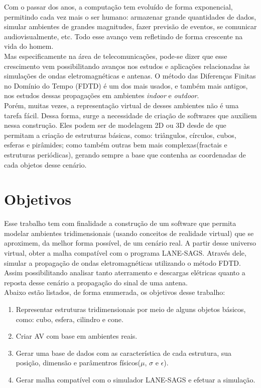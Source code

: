 Com o passar dos anos, a computação tem evoluído de forma exponencial\cite{comp_history}, permitindo cada vez mais o ser humano: armazenar grande quantidades de dados, simular ambientes de grandes magnitudes, fazer previsão de eventos, se comunicar audiovisualmente, etc. Todo esse avanço vem refletindo de forma crescente na vida do homem.\\

Mas especificamente na área de telecomunicações, pode-se dizer que esse crescimento vem possibilitando avanços nos estudos e aplicações relacionadas às simulações de ondas eletromagnéticas e antenas. O método das Diferenças Finitas no Domínio do Tempo (FDTD)\cite{fdtd_intro} é um dos mais usados, e também mais antigos, nos estudos dessas propagações em ambientes \textit{indoor} e \textit{outdoor}\cite{rodrigo_intro}.\\

Porém, muitas vezes, a representação virtual de desses ambientes não é uma tarefa fácil. Dessa forma, surge a necessidade de criação de softwares que auxiliem nessa construção. Eles podem ser de modelagem 2D ou 3D desde de que permitam a criação de estruturas básicas, como: triângulos, círculos, cubos, esferas e pirâmides; como também outras bem mais complexas(fractais e estruturas periódicas), gerando sempre a base que contenha as coordenadas de cada objetos desse cenário.

\section{Objetivos}
Esse trabalho tem com finalidade a construção de um software que permita modelar ambientes tridimensionais (usando conceitos de realidade virtual) que se aproximem, da melhor forma possível, de um cenário real. A partir desse universo virtual, obter a malha compatível com o programa LANE-SAGS. Através dele, simular a propagação de ondas eletromagnéticas utilizando o método FDTD. Assim possibilitando analisar tanto aterramento e descargas elétricas quanto a reposta desse cenário a propagação do sinal de uma antena.\\

Abaixo estão listados, de forma enumerada, os objetivos desse trabalho:
\begin{enumerate}
\item {Representar estruturas tridimensionais por meio de alguns objetos básicos, como: cubo, esfera, cilindro e cone.}
\item {Criar AV com base em ambientes reais. }
\item {Gerar uma base de dados com as característica de cada estrutura, sua posição, dimensão e parâmentros físicos($\mu$, $\sigma$ e $\epsilon$).}
\item {Gerar malha compatível com o simulador LANE-SAGS e efetuar a simulação.}
\end{enumerate}

